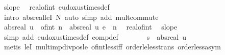 \begin{isabellebody}
\ slope\ \isamarkupfalse%
\ real{\isacharunderscore}{\kern0pt}of{\isacharunderscore}{\kern0pt}int\ eudoxus{\isacharunderscore}{\kern0pt}times{\isacharunderscore}{\kern0pt}def\ \isamarkupfalse%
\ {\isacharparenleft}{\kern0pt}intro\ abs{\isacharunderscore}{\kern0pt}real{\isacharunderscore}{\kern0pt}leI{\isacharbrackleft}{\kern0pt}\ {\isacharquery}{\kern0pt}N{\isacharequal}{\kern0pt}{}{\isacharbrackright}{\kern0pt}{\isacharparenright}{\kern0pt}\ {\isacharparenleft}{\kern0pt}auto\ simp\ add{\isacharcolon}{\kern0pt}\ mult{\isachardot}{\kern0pt}commute{\isacharparenright}{\kern0pt}\ \isanewline
\ \ \ \ \isamarkupfalse%
\ \isamarkupfalse%
\ {\isachardoublequoteopen}abs{\isacharunderscore}{\kern0pt}real\ u\ {\isacharasterisk}{\kern0pt}\ of{\isacharunderscore}{\kern0pt}int\ n\ {\isacharequal}{\kern0pt}\ abs{\isacharunderscore}{\kern0pt}real\ {\isacharparenleft}{\kern0pt}u\ {\isacharasterisk}{\kern0pt}\isactrlsub e\ {\isacharparenleft}{\kern0pt}{\isacharasterisk}{\kern0pt}{\isacharparenright}{\kern0pt}\ n{\isacharparenright}{\kern0pt}{\isachardoublequoteclose}\ \isamarkupfalse%
\ real{\isacharunderscore}{\kern0pt}of{\isacharunderscore}{\kern0pt}int\ \isamarkupfalse%
\ slope\ \isamarkupfalse%
\ {\isacharparenleft}{\kern0pt}simp\ add{\isacharcolon}{\kern0pt}\ eudoxus{\isacharunderscore}{\kern0pt}times{\isacharunderscore}{\kern0pt}def\ comp{\isacharunderscore}{\kern0pt}def{\isacharparenright}{\kern0pt}\isanewline
\ \ \ \ \isamarkupfalse%
\ \isamarkupfalse%
\ {\isachardoublequoteopen}s\ {\isasymle}\ abs{\isacharunderscore}{\kern0pt}real\ u{\isachardoublequoteclose}\ \isamarkupfalse%
\ {\isacharasterisk}{\kern0pt}\ \isamarkupfalse%
\ {\isacharparenleft}{\kern0pt}metis\ leI\ mult{\isacharunderscore}{\kern0pt}imp{\isacharunderscore}{\kern0pt}div{\isacharunderscore}{\kern0pt}pos{\isacharunderscore}{\kern0pt}le\ of{\isacharunderscore}{\kern0pt}int{\isacharunderscore}{\kern0pt}{}{\isacharunderscore}{\kern0pt}less{\isacharunderscore}{\kern0pt}iff\ order{\isacharunderscore}{\kern0pt}le{\isacharunderscore}{\kern0pt}less{\isacharunderscore}{\kern0pt}trans\ order{\isacharunderscore}{\kern0pt}less{\isacharunderscore}{\kern0pt}asym{\isacharparenright}{\kern0pt}\isanewline
\ \ \isacommand{{\isacharbraceright}{\kern0pt}}\isamarkupfalse%
\isanewline
\ \ \isamarkupfalse%
\isanewline
\ \ \isacommand{{\isacharbraceleft}{\kern0pt}}\isamarkupfalse%

\end{isabellebody}
